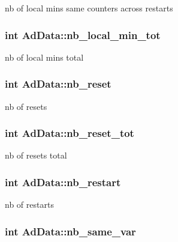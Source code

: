 nb of local mins same counters across restarts \hypertarget{classAdData_aee345de54ad3dacf05875ec8a5e64114}{
\subsubsection[{nb\-\_\-local\-\_\-min\-\_\-tot}]{\setlength{\rightskip}{0pt plus 5cm}int {\bf \-Ad\-Data\-::nb\-\_\-local\-\_\-min\-\_\-tot}}}\label{classAdData_aee345de54ad3dacf05875ec8a5e64114}
nb of local mins total \hypertarget{classAdData_a1c64449d7cdeee22d68aa719d3249908}{
\subsubsection[{nb\-\_\-reset}]{\setlength{\rightskip}{0pt plus 5cm}int {\bf \-Ad\-Data\-::nb\-\_\-reset}}}\label{classAdData_a1c64449d7cdeee22d68aa719d3249908}
nb of resets \hypertarget{classAdData_a55bfd4eb00c611fdc673d09630bba694}{
\subsubsection[{nb\-\_\-reset\-\_\-tot}]{\setlength{\rightskip}{0pt plus 5cm}int {\bf \-Ad\-Data\-::nb\-\_\-reset\-\_\-tot}}}\label{classAdData_a55bfd4eb00c611fdc673d09630bba694}
nb of resets total \hypertarget{classAdData_a1b4d75a8af404b120559b52ac2a387b9}{
\subsubsection[{nb\-\_\-restart}]{\setlength{\rightskip}{0pt plus 5cm}int {\bf \-Ad\-Data\-::nb\-\_\-restart}}}\label{classAdData_a1b4d75a8af404b120559b52ac2a387b9}
nb of restarts \hypertarget{classAdData_a3f98aa5205fb59c2f8ac70be9626c57c}{
\subsubsection[{nb\-\_\-same\-\_\-var}]{\setlength{\rightskip}{0pt plus 5cm}int {\bf \-Ad\-Data\-::nb\-\_\-same\-\_\-var}}}\label{classAdData_a3f98aa5205fb59c2f8ac70be9626c57c}

